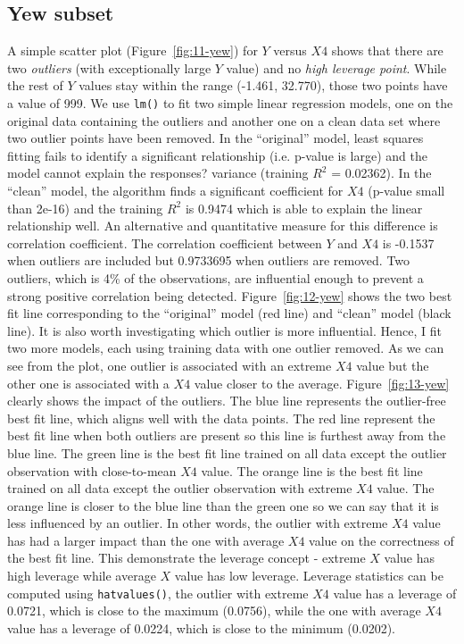 \documentclass{article}
\begin{document}
\subsection{Yew subset}

A simple scatter plot (Figure~\ref{fig:11-yew}) for $Y$ versus $X4$ shows that there are two {\em outliers} (with exceptionally large $Y$ value) and no {\em high leverage point}. While the rest of $Y$ values stay within the range (-1.461, 32.770), those two points have a value of 999. We use {\tt lm()} to fit two simple linear regression models, one on the original data containing the outliers and another one on a clean data set where two outlier points have been removed. In the ``original'' model, least squares fitting fails to identify a significant relationship (i.e. p-value is large) and the model cannot explain the responses? variance (training $R^2$ = 0.02362). In the ``clean'' model, the algorithm finds a significant coefficient for $X4$ (p-value small than 2e-16) and the training $R^2$ is 0.9474 which is able to explain the linear relationship well. An alternative and quantitative measure for this difference is correlation coefficient. The correlation coefficient between $Y$ and $X4$ is -0.1537 when outliers are included but 0.9733695 when outliers are removed. Two outliers, which is 4\% of the observations, are influential enough to prevent a strong positive correlation being detected. Figure~\ref{fig:12-yew} shows the two best fit line corresponding to the ``original'' model (red line) and ``clean'' model (black line). It is also worth investigating which outlier is more influential. Hence, I fit two more models, each using training data with one outlier removed. As we can see from the plot, one outlier is associated with an extreme $X4$ value but the other one is associated with a $X4$ value closer to the average. Figure~\ref{fig:13-yew} clearly shows the impact of the outliers. The blue line represents the outlier-free best fit line, which aligns well with the data points. The red line represent the best fit line when both outliers are present so this line is furthest away from the blue line. The green line is the best fit line trained on all data except the outlier observation with close-to-mean $X4$ value. The orange line is the best fit line trained on all data except the outlier observation with extreme $X4$ value. The orange line is closer to the blue line than the green one so we can say that it is less influenced by an outlier. In other words, the outlier with extreme $X4$ value has had a larger impact than the one with average $X4$ value on the correctness of the best fit line. This demonstrate the leverage concept - extreme $X$ value has high leverage while average $X$ value has low leverage. Leverage statistics can be computed using {\tt hatvalues()}, the outlier with extreme $X4$ value has a leverage of 0.0721, which is close to the maximum (0.0756), while the one with average $X4$ value has a leverage of 0.0224, which is close to the minimum (0.0202).
\end{document}
